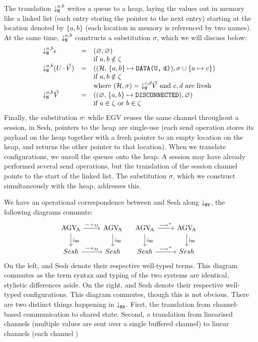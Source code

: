 \documentclass[acmsmall,review,anonymous]{acmart}
\begin{document}
The translation $\mtrh[a,b]{}$ writes a queue to a heap, laying the values out in memory like a linked list (each entry storing the pointer to the next entry) starting at the location denoted by $\{a,b\}$ (each location in memory is referenced by two names). At the same time, $\mtrh[a,b]{}$ constructs a substitution $\sigma$, which we will discuss below:
\[
  \begin{array}{lcl}
    \mtrh[a,b]{\gvVecEmp}
    & = & (\rvHeapEmp, \varnothing)
    \\ && \text{if }\tm{a},\tm{b}\notin\zeta
    \\
    \mtrh[a,b]{\parens{\tm{U}\gvVecAdd\gvVec{V}}}
    & = & ((\rvHeapData{\rvHeap{H}}{a}{b}{\rvMemData{U}{d}}), \sigma \cup \{\tm{a}\mapsto\tm{c}\})
    \\ && \text{if }\tm{a},\tm{b}\notin\zeta
    \\ && \text{where }(\rvHeap{H}, \sigma) = \mtrh[c,d]{\gvVec{V}}
          \text{ and }\tm{c},\tm{d}\text{ are fresh}
    \\
    \mtrh[a,b]{\gvVec{V}}
    & = & ((\rvHeapDisc{\rvHeapEmp}{a}{b}), \varnothing)
    \\ && \text{if }\tm{a}\in\zeta\text{ or }\tm{b}\in\zeta
  \end{array}
\]
Finally, the substitution $\sigma$: while EGV reuses the same channel throughout a session, in Sesh, pointers to the heap are single-use (each send operation stores its payload on the heap together with a fresh pointer to an empty location on the heap, and returns the other pointer to that location).
When we translate configurations, we unroll the queues onto the heap. A session may have already performed several send operations, but the translation of the session channel points to the start of the linked list. The substitution $\sigma$, which we construct simultaneously with the heap, addresses this.

We have an operational correspondence between \affineAGV and Sesh along $\mtr{}$, \ie the following diagrams commute:
\[
  \begin{tikzcd}
    \affineAGV
    \rar{\gvRedArrPure}
    \dar{\mtr{}}
    &
    \affineAGV
    \dar{\mtr{}}
    \\
    Sesh
    \rar{\gvRedArrPure}
    &
    Sesh
  \end{tikzcd}
  \quad
  \begin{tikzcd}
    \affineAGV
    \rar{\gvRedArr^{+}}
    \dar{\mtr{}}
    &
    \affineAGV
    \dar{\mtr{}}
    \\
    Sesh
    \rar{\gvRedArr^{+}}
    &
    Sesh
  \end{tikzcd}
\]
On the left, \affineAGV and Sesh denote their respective well-typed terms. This diagram commutes as the term syntax and typing of the two systems are identical, stylistic differences aside.
On the right, \affineAGV and Sesh denote their respective well-typed configurations. This diagram commutes, though this is not obvious.
There are two distinct things happening in $\mtr{}$. First, the translation from channel-based communication to shared state. Second, a translation from linearised channels (multiple values are sent over a single buffered channel) to linear channels (each channel )





\end{document}
